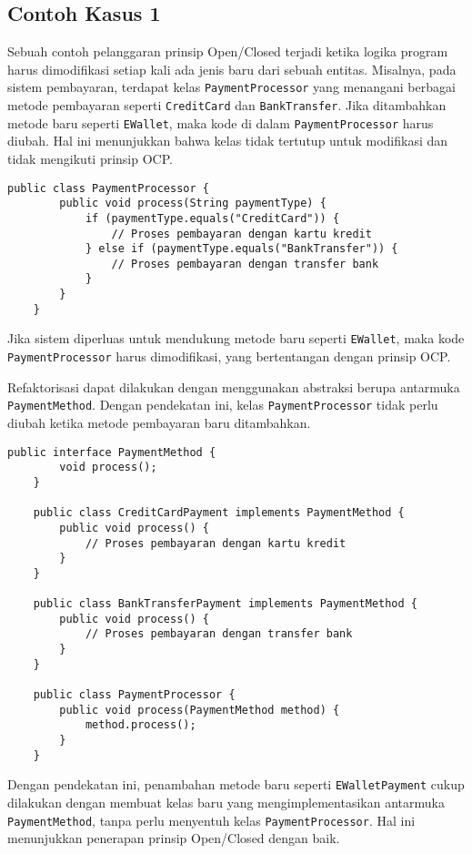\subsection{Contoh Kasus 1}
Sebuah contoh pelanggaran prinsip Open/Closed terjadi ketika logika program harus dimodifikasi setiap kali ada jenis baru dari sebuah entitas. Misalnya, pada sistem pembayaran, terdapat kelas \texttt{PaymentProcessor} yang menangani berbagai metode pembayaran seperti \texttt{CreditCard} dan \texttt{BankTransfer}. Jika ditambahkan metode baru seperti \texttt{EWallet}, maka kode di dalam \texttt{PaymentProcessor} harus diubah. Hal ini menunjukkan bahwa kelas tidak tertutup untuk modifikasi dan tidak mengikuti prinsip OCP.

\begin{lstlisting}[style=JavaStyle, caption={Contoh pelanggaran OCP}]
	public class PaymentProcessor {
		public void process(String paymentType) {
			if (paymentType.equals("CreditCard")) {
				// Proses pembayaran dengan kartu kredit
			} else if (paymentType.equals("BankTransfer")) {
				// Proses pembayaran dengan transfer bank
			}
		}
	}
\end{lstlisting}

Jika sistem diperluas untuk mendukung metode baru seperti \texttt{EWallet}, maka kode \texttt{PaymentProcessor} harus dimodifikasi, yang bertentangan dengan prinsip OCP.

Refaktorisasi dapat dilakukan dengan menggunakan abstraksi berupa antarmuka \texttt{PaymentMethod}. Dengan pendekatan ini, kelas \texttt{PaymentProcessor} tidak perlu diubah ketika metode pembayaran baru ditambahkan.

\begin{lstlisting}[style=JavaStyle, caption={Refaktor menggunakan OCP}]
	public interface PaymentMethod {
		void process();
	}
	
	public class CreditCardPayment implements PaymentMethod {
		public void process() {
			// Proses pembayaran dengan kartu kredit
		}
	}
	
	public class BankTransferPayment implements PaymentMethod {
		public void process() {
			// Proses pembayaran dengan transfer bank
		}
	}
	
	public class PaymentProcessor {
		public void process(PaymentMethod method) {
			method.process();
		}
	}
\end{lstlisting}

Dengan pendekatan ini, penambahan metode baru seperti \texttt{EWalletPayment} cukup dilakukan dengan membuat kelas baru yang mengimplementasikan antarmuka \texttt{PaymentMethod}, tanpa perlu menyentuh kelas \texttt{PaymentProcessor}. Hal ini menunjukkan penerapan prinsip Open/Closed dengan baik.


